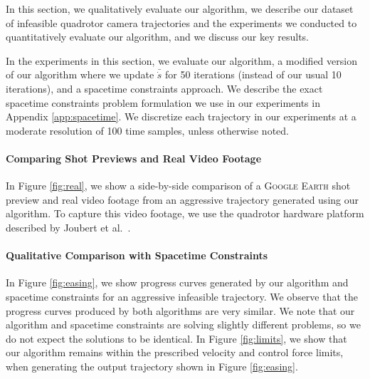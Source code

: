 In this section, we qualitatively evaluate our algorithm, we describe our dataset of infeasible quadrotor camera trajectories and the experiments we conducted to quantitatively evaluate our algorithm, and we discuss our key results.

In the experiments in this section, we evaluate our algorithm, a modified version of our algorithm where we update $\bar{\dot{s}}$ for 50 iterations (instead of our usual 10 iterations), and a spacetime constraints approach.
We describe the exact spacetime constraints problem formulation we use in our experiments in Appendix \ref{app:spacetime}.
We discretize each trajectory in our experiments at a moderate resolution of 100 time samples, unless otherwise noted.

\paragraph{Comparing Shot Previews and Real Video Footage}

In Figure \ref{fig:real}, we show a side-by-side comparison of a \textsc{Google Earth} shot preview and real video footage from an aggressive trajectory generated using our algorithm.
To capture this video footage, we use the quadrotor hardware platform described by Joubert et al.~.

\paragraph{Qualitative Comparison with Spacetime Constraints}


In Figure \ref{fig:easing}, we show progress curves generated by our algorithm and spacetime constraints for an aggressive infeasible trajectory.
We observe that the progress curves produced by both algorithms are very similar.
We note that our algorithm and spacetime constraints are solving slightly different problems, so we do not expect the solutions to be identical.
In Figure \ref{fig:limits}, we show that our algorithm remains within the prescribed velocity and control force limits, when generating the output trajectory shown in Figure \ref{fig:easing}.

